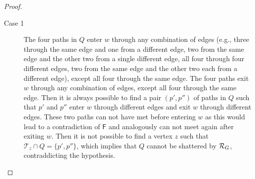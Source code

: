 \begin{proof}
  \begin{description}
    \item[Case 1] The four paths in $Q$ enter $w$ through any combination of
      edges (e.g., three through the same edge and one from a different edge,
      two from the same edge and the other two from a single different edge, all four
      through four different edges, two from the same edge and the other two
      each from a different edge), except all four through the same edge. The four paths
      exit $w$ through any combination of edges, except all four through the
      same edge. Then it is always possible to find a pair $(p',p'')$ of paths
      in $Q$ such that $p'$ and $p''$ enter $w$ through different edges and exit
      $w$ through different edges. These two paths can not have met before
      entering $w$ as this would lead to a contradiction of $\mathsf{F}$ and
      analogously can not meet again after exiting $w$. Then it is not possible
      to find a vertex $z$ such that $\mathcal{T}_z\cap Q=\{p',p''\}$, which
      implies that $Q$ cannot be shattered by $\mathcal{R}_G$, contraddicting the
      hypothesis.



\end{description}
\end{proof}
